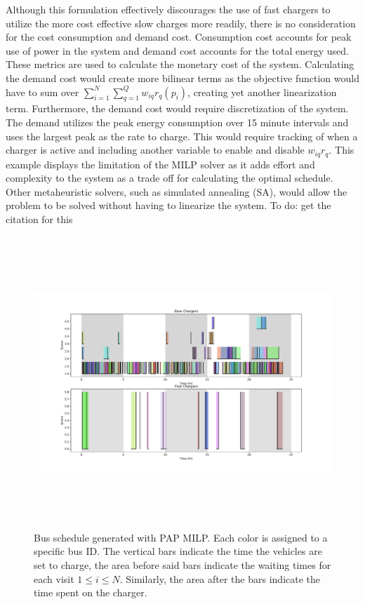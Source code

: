 \documentclass[letterpaper, 10pt, conference]{IEEEtran}
\newcommand{\TODO}[1]{{\color{green} To do: #1}}                                %
\begin{document}
Although this formulation effectively discourages the use of fast chargers to utilize the more cost effective slow
charges more readily, there is no consideration for the cost consumption and demand cost. Consumption cost accounts for
peak use of power in the system and demand cost accounts for the total energy used. These metrics are used to calculate
the monetary cost of the system. Calculating the demand cost would create more bilinear terms as the objective function
would have to sum over $\sum_{i=1}^N \sum_{q=1}^Q w_{iq}{r_q}(p_i)$, creating yet another linearization term. Furthermore, the
demand cost would require discretization of the system. The demand utilizes the peak energy consumption over 15 minute
intervals and uses the largest peak as the rate to charge. This would require tracking of when a charger is active and
including another variable to enable and disable $w_{iq}r_q$. This example displays the limitation of the MILP solver as
it adds effort and complexity to the system as a trade off for calculating the optimal schedule. Other metaheuristic
solvers, such as simulated annealing (SA), would allow the problem to be solved without having to linearize the system.
\TODO{get the citation for this}

\begin{figure}[ht]
	\centering
	\includegraphics[trim=1in 0.5in 1in 0.5in, width=\linewidth, height=11cm]{schedule.pdf}
	\caption{Bus schedule generated with PAP MILP. Each color is assigned to a specific bus ID. The vertical bars indicate the time the vehicles are set to charge, the area before said bars indicate the waiting times for each visit $1 \leq i \leq N$. Similarly, the area after the bars indicate the time spent on the charger.}
	\label{fig:schedule}
\end{figure}
\end{document}
